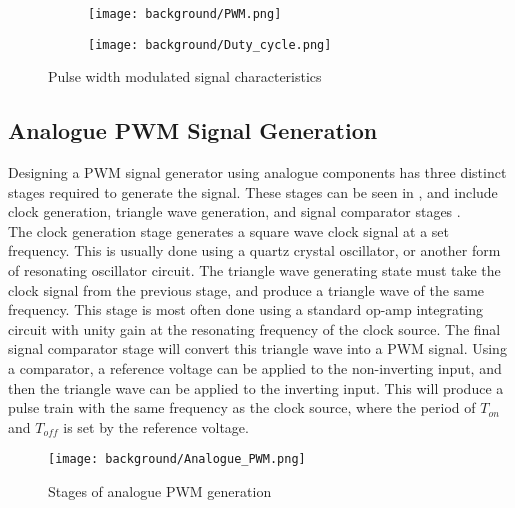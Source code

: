 \begin{figure}[H]
      \centering
      \begin{subfigure}{0.45\textwidth}
          \texttt{[image: background/PWM.png]}
          \label{F:PWM}
      \end{subfigure}
      \hspace{10pt}
      \begin{subfigure}{0.5\textwidth}
          \texttt{[image: background/Duty\_cycle.png]}
          \vspace{-6pt}
          \label{F:Duty}
      \end{subfigure}
      \caption{Pulse width modulated signal characteristics}
      \label{F:PWM_description}
  \end{figure}

\subsection{Analogue PWM Signal Generation} \label{S:analogue_PWM_back}

Designing a PWM signal generator using analogue components has three distinct stages required to generate the signal. These stages can be seen in , and include clock generation, triangle wave generation, and signal comparator stages \cite{Caldwell2013}.\\ 

The clock generation stage generates a square wave clock signal at a set frequency. This is usually done using a quartz crystal oscillator, or another form of resonating oscillator circuit. The triangle wave generating state must take the clock signal from the previous stage, and produce a triangle wave of the same frequency. This stage is most often done using a standard op-amp integrating circuit with unity gain at the resonating frequency of the clock source. The final signal comparator stage will convert this triangle wave into a PWM signal. Using a comparator, a reference voltage can be applied to the non-inverting input, and then the triangle wave can be applied to the inverting input. This will produce a pulse train with the same frequency as the clock source, where the period of $T_{on}$ and $T_{off}$ is set by the reference voltage. 

\begin{figure}[H]
	\texttt{[image: background/Analogue\_PWM.png]}
	\caption{Stages of analogue PWM generation}
	\label{F:analogue_PWM}
\end{figure}


